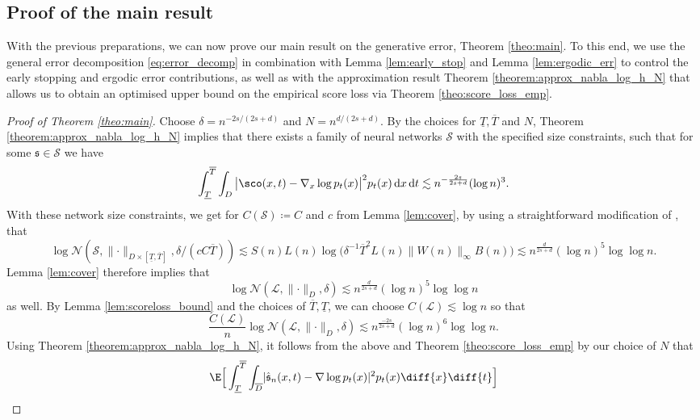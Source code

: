 \documentclass[a4paper, 11pt, headings = small, abstract]{scrartcl}
\begin{document}
\subsection{Proof of the main result}\label{susbsec:proof_main}
With the previous preparations, we can now prove our main result on the generative error, Theorem \ref{theo:main}. To this end, we use the general error decomposition \eqref{eq:error_decomp} in combination with Lemma \ref{lem:early_stop} and Lemma \ref{lem:ergodic_err} to control the early stopping and ergodic error contributions, as well as with the approximation result Theorem \ref{theorem:approx_nabla_log_h_N} that allows us to obtain an optimised upper bound on the empirical score loss via Theorem \ref{theo:score_loss_emp}.

\begin{proof}[Proof of Theorem \ref{theo:main}]
Choose $\delta = n^{-2s/(2s+d)}$ and $N = n^{d/(2s+d)}$. By the choices for $\underline{T}, \overline{T}$ and $N$, Theorem \ref{theorem:approx_nabla_log_h_N} implies that there exists a family of neural networks $\mathcal{S}$ with the specified size constraints, such that for some $\mathfrak{s} \in \mathcal{S}$ we have 
\[\int_{\underline{T}}^{\overline{T}}\int_D
\big|\sco(x,t)-\nabla_x\log p_t(x)\big|^2p_t(x)\,\mathrm{d}x\,\mathrm{d}t
\lesssim n^{-\frac{2s}{2s+d}}(\log n)^3.\]
With these network size constraints, we get for $C(\mathcal{S}) \coloneq C$ and $c$ from Lemma \ref{lem:cover}, by using a straightforward modification of \cite[Lemma C.2]{oko23}, that 
\[\log \mathcal{N}(\mathcal{S},\lVert  \cdot  \rVert_{D \times [\underline{T},\overline{T}]}, \delta/(cC\overline{T})) \lesssim S(n)L(n)\log\big(\delta^{-1} \overline{T}^2L(n)\lVert W(n) \rVert_\infty B(n)\big) \lesssim n^{\frac{d}{2s+d}} (\log n)^5 \log \log n.\]
Lemma \ref{lem:cover} therefore implies that 
\[\log \mathcal{N}(\mathcal{L},\lVert  \cdot  \rVert_D,\delta) \lesssim n^{\frac{d}{2s+d}} (\log n)^5 \log \log n\]
as well. By Lemma \ref{lem:scoreloss_bound} and the choices of $\overline{T},\underline{T}$, we can choose $C(\mathcal{L}) \lesssim \log n$ so that 
\[\frac{C(\mathcal{L})}{n} \log \mathcal{N}(\mathcal{L},\lVert \cdot \rVert_D,\delta) \lesssim n^{\frac{-2s}{2s+d}} (\log n)^6 \log \log n.\]
Using Theorem \ref{theorem:approx_nabla_log_h_N}, it follows from the above and Theorem \ref{theo:score_loss_emp} by our choice of $N$ that 
\begin{align*} 
&\E\Big[\int_{\underline{T}}^{\overline{T}} \int_{\overline{D}} \lvert \hat{\mathfrak{s}}_n(x,t) - \nabla \log p_t(x) \rvert^2 p_t(x) \diff{x} \diff{t}  \Big] \\ 

\end{align*}
\end{proof}
\end{document}
